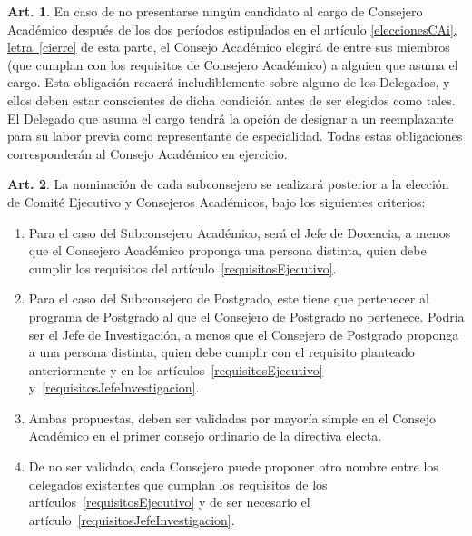 \documentclass[letterpaper,11pt]{article}
\theoremstyle{definition}%
\newtheorem{art}{Art.} %
\newcommand{\aaref}[2]{\hyperref[#2]{\ref*{#1}, letra~\ref*{#2}}}
\begin{document}
\begin{art}\label{eleccionExtraordinariaCAPregrado}
	En caso de no presentarse ningún candidato al cargo de Consejero Académico después de los dos períodos estipulados en el artículo \aaref{eleccionesCAi}{cierre} de esta parte, el Consejo Académico elegirá de entre sus miembros (que cumplan con los requisitos de Consejero Académico) a alguien que asuma el cargo. Esta obligación recaerá ineludiblemente sobre alguno de los Delegados, y ellos deben estar conscientes de dicha condición antes de ser elegidos como tales. El Delegado que asuma el cargo tendrá la opción de designar a un reemplazante para su labor previa como representante de especialidad. Todas estas obligaciones corresponderán al Consejo Académico en ejercicio.
\end{art}

\begin{art}\label{nominacionSubconsejeros}
	La nominación de cada subconsejero se realizará posterior a la elección de Comité Ejecutivo y Consejeros Académicos, bajo los siguientes criterios:
	\begin{enumerate}
		\item Para el caso del Subconsejero Académico, será el Jefe de Docencia, a menos que el Consejero Académico proponga una persona distinta, quien debe cumplir los requisitos del artículo~\ref{requisitosEjecutivo}.

		\item Para el caso del Subconsejero de Postgrado, este tiene que pertenecer al programa de Postgrado al que el Consejero de Postgrado no pertenece. Podría ser el Jefe de Investigación, a menos que el Consejero de Postgrado proponga a una persona distinta, quien debe cumplir con el requisito planteado anteriormente y en los artículos~\ref{requisitosEjecutivo} y~\ref{requisitosJefeInvestigacion}.

		\item Ambas propuestas, deben ser validadas por mayoría simple en el Consejo Académico en el primer consejo ordinario de la directiva electa.

		\item De no ser validado, cada Consejero puede proponer otro nombre entre los delegados existentes que cumplan los requisitos de los artículos~\ref{requisitosEjecutivo} y de ser necesario el artículo~\ref{requisitosJefeInvestigacion}.
	\end{enumerate}
\end{art}
\end{document}
